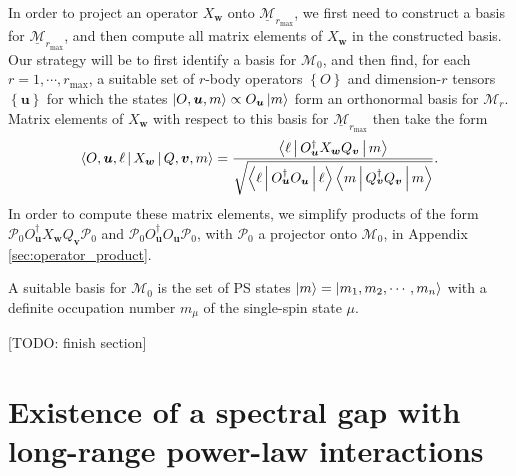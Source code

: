 \documentclass[nofootinbib,notitlepage,11pt]{revtex4-2}
\renewcommand{\t}{\text} %
\newcommand{\f}[2]{\dfrac{#1}{#2}} %
\renewcommand{\set}[1]{\left\{#1\right\}} %
\newcommand{\bk}{\Braket} %
\newcommand{\m}{\bm} %
\newcommand{\1}{\mathds{1}}
\newcommand{\M}{\mathcal{M}}
\renewcommand{\P}{\mathcal{P}}
\newcommand{\ul}{\underline}
\newcommand{\red}[1]{{\color{red} #1}}
\begin{document}
In order to project an operator $X_{\m w}$ onto
$\ul{\M}_{r_{\t{max}}}$, we first need to construct a basis for
$\ul{\M}_{r_{\t{max}}}$, and then compute all matrix elements of
$X_{\m w}$ in the constructed basis.  Our strategy will be to first
identify a basis for $\M_0$, and then find, for each
$r=1,\cdots,r_{\t{max}}$, a suitable set of $r$-body operators
$\set{O}$ and dimension-$r$ tensors $\set{\m u}$ for which the states
$\ket{O,\m u,m}\propto O_{\m u}\ket{m}$ form an orthonormal basis for
$\M_r$.  Matrix elements of $X_{\m w}$ with respect to this basis for
$\ul{\M}_{r_{\t{max}}}$ then take the form
\begin{align}
  \bk{O,\m u,\ell|X_{\m w}|Q,\m v,m}
  = \f{\bk{\ell|O_{\m u}^\dag X_{\m w} Q_{\m v}|m}}
  {\sqrt{\bk{\ell|O_{\m u}^\dag O_{\m u}|\ell}
      \bk{m|Q_{\m v}^\dag Q_{\m v}|m}}}.
  \label{eq:matrix_element}
\end{align}
In order to compute these matrix elements, we simplify products of the
form $\P_0 O_{\m u}^\dag X_{\m w} Q_{\m v} \P_0$ and
$\P_0 O_{\m u}^\dag O_{\m u} \P_0$, with $\P_0$ a projector onto
$\M_0$, in Appendix \ref{sec:operator_product}.

A suitable basis for $\M_0$ is the set of PS states
$\ket{m}=\ket{m_1,m_2,\cdots,m_n}$ with a definite occupation number
$m_\mu$ of the single-spin state $\mu$.




\vspace{3cm}



\red{[TODO: finish section]}



\newpage
\appendix

\section{Existence of a spectral gap with long-range power-law
  interactions}
\label{sec:spectral_gap}
\end{document}
